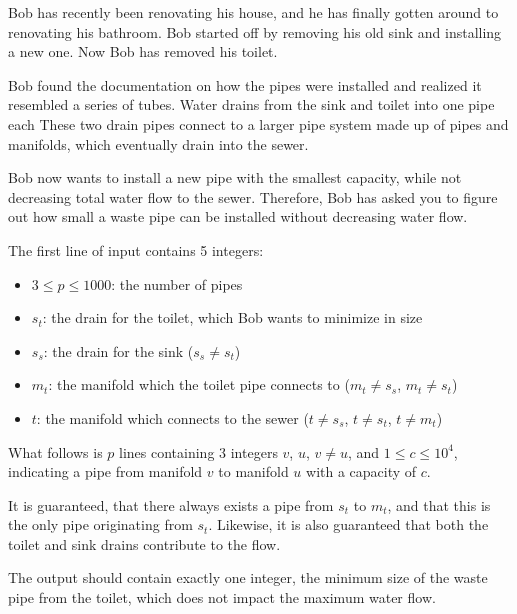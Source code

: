 Bob has recently been renovating his house, and he has finally gotten around to renovating his bathroom.
Bob started off by removing his old sink and installing a new one.
Now Bob has removed his toilet.

Bob found the documentation on how the pipes were installed and realized it resembled a series of tubes.
Water drains from the sink and toilet into one pipe each
These two drain pipes connect to a larger pipe system made up of pipes and manifolds, which eventually drain into the sewer.

Bob now wants to install a new pipe with the smallest capacity, while not decreasing total water flow to the sewer.
Therefore, Bob has asked you to figure out how small a waste pipe can be installed without decreasing water flow.

\begin{Input}
The first line of input contains 5 integers:

\begin{itemize}
 \item $3 \le p \le 1000$: the number of pipes
 \item $s_t$: the drain for the toilet, which Bob wants to minimize in size
 \item $s_s$: the drain for the sink ($s_s \ne s_t$)
 \item $m_t$: the manifold which the toilet pipe connects to ($m_t \ne s_s$, $m_t \ne s_t$)
 \item $t$: the manifold which connects to the sewer ($t \ne s_s$, $t \ne s_t$, $t \ne m_t$)
\end{itemize}
What follows is $p$ lines containing 3 integers $v$, $u$, $v \ne u$, and $1 \le c \le 10^4$, indicating a pipe from manifold $v$ to manifold $u$ with a capacity of $c$.
\end{Input}

It is guaranteed, that there always exists a pipe from $s_t$ to $m_t$, and that this is the only pipe originating from $s_t$.
Likewise, it is also guaranteed that both the toilet and sink drains contribute to the flow.

\begin{Output}
The output should contain exactly one integer, the minimum size of the waste pipe from the toilet, which does not impact the maximum water flow.
\end{Output}


